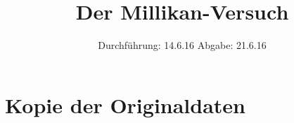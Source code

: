 

\subject{V 503}
\title{Der Millikan-Versuch}
\date{
  Durchführung: 14.6.16
  \hspace{3em}
  Abgabe: 21.6.16
}



\maketitle
\thispagestyle{empty}
\tableofcontents
\newpage






\printbibliography

\appendix
\section{Kopie der Originaldaten}


